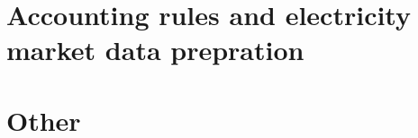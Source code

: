 \chapter{Accounting rules and electricity market data prepration}
\label{sec:accounting-data-prepare}

\chapter{Other}
